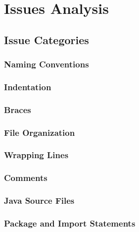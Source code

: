 \section{Issues Analysis}

\subsection{Issue Categories}

\subsubsection{Naming Conventions}
    
    
\subsubsection{Indentation}
    
    
\subsubsection{Braces}
    
    
\subsubsection{File Organization}
    
    
\subsubsection{Wrapping Lines}
    
    
\subsubsection{Comments}
    
    
\subsubsection{Java Source Files}
    
    
\subsubsection{Package and Import Statements}
    
    
